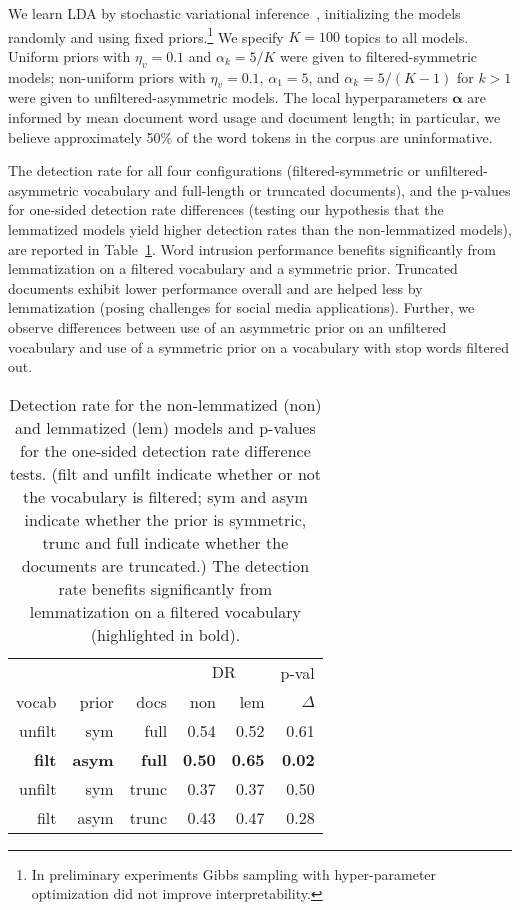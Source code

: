 \documentclass[11pt,letterpaper]{article}
\renewcommand{\vec}{\boldsymbol}   %
\newcommand{\valpha}{{\vec{\alpha}}}
\newcommand{\DR}{\ensuremath{\textrm{DR}}}
\begin{document}
We learn LDA by stochastic variational
inference~\cite{hoffman2013}, initializing the models randomly and
using fixed priors.\footnote{
    In preliminary experiments Gibbs
    sampling with hyper-parameter optimization did not improve
    interpretability.
}
We specify $K = 100$ topics to all models.
Uniform priors with $\eta_v = 0.1$ and
$\alpha_k = 5 / K$ were given to
filtered-symmetric models; non-uniform priors with
$\eta_v = 0.1$, $\alpha_1 = 5$, and $\alpha_k = 5 / (K-1)$
for $k > 1$
were given to unfiltered-asymmetric models.
The local hyperparameters $\valpha$ are informed by mean
document word usage and document length; in particular, we
believe approximately 50\% of the word tokens in the corpus are
uninformative.

The detection rate for all four configurations (filtered-symmetric or unfiltered-asymmetric
vocabulary and full-length or truncated documents), and the
p-values for one-sided detection rate differences (testing our
hypothesis that the lemmatized models yield higher detection rates than
the non-lemmatized models), are reported in
Table~\ref{tab:detection-rate}.  Word intrusion performance benefits
significantly from lemmatization on a filtered vocabulary and a
symmetric prior.
Truncated documents exhibit lower
performance overall and are helped less by lemmatization (posing
challenges for social media applications).
Further, we observe differences
between use of an asymmetric prior on an unfiltered vocabulary and
use of a symmetric prior on a vocabulary with stop words filtered out.

\begin{table}
  \centering
    \begin{tabular}{rrrrrr}
        \toprule
              &              &                & \multicolumn{2}{c}{$\DR$} &       p-val   \\
        vocab & prior        & docs           & non         & lem &         $\Delta$ \\\midrule
        unfilt & sym         & full           &          0.54 &          0.52 &          0.61 \\
        \textbf{filt} & \textbf{asym} & \textbf{full} & \textbf{0.50} & \textbf{0.65} & \textbf{0.02} \\
        unfilt & sym         & trunc          &          0.37 &          0.37 &          0.50 \\
        filt & asym          & trunc          &          0.43 &          0.47 &          0.28 \\
        \bottomrule
    \end{tabular}
    \caption{Detection rate for the non-lemmatized (non) and
        lemmatized (lem) models
        and p-values for the one-sided detection rate difference tests.
        (filt and unfilt indicate whether or not the vocabulary is
        filtered; sym and asym indicate whether the prior is symmetric,
        trunc and full indicate whether the documents are truncated.)
        The detection rate benefits significantly from lemmatization on
        a filtered vocabulary (highlighted in bold).}
    \label{tab:detection-rate}
\end{table}
\end{document}
